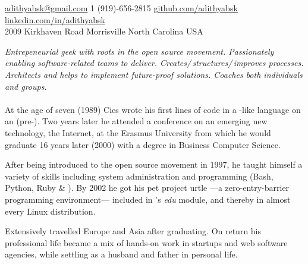 \documentclass[10pt,letterpaper]{article}
\begin{document}
\sloppy  %


\nobreakvspace{0.3em}  %

\noindent\href{mailto:adithyabsk@gmail.com}{adithyabsk\mbox{}@\mbox{}gmail.com}\sbull
\textsmaller{+}1 (919)-656-2815\sbull
\href{https://github.com/adithyabsk}{github.com/adithyabsk}\sbull
\href{http://linkedin.com/in/adithyabsk}{linkedin.com/in/adithyabsk}
\\
2009 Kirkhaven Road\sbull
Morrisville\sbull
North Carolina\sbull
USA

\spacedhrule{0.9em}{-0.4em}  %


\vspace{-1.3em}  %
\begin{multicols}{2}  %
\noindent \emph{Entrepeneurial geek with roots in the open source movement. Passionately enabling software-related teams to deliver. Creates/\,structures/\,improves processes. Architects and helps to implement future-proof solutions. Coaches both individuals and groups.}
\\
\\
At the age of seven (1989) Cies wrote his first lines of code in a -like language on an  (pre-).  Two years later he attended a conference on an emerging new technology, the Internet, at the Erasmus University from which he would graduate 16 years later (2000) with a degree in Business Computer Science.

After being introduced to the open source movement in 1997, he taught himself a variety of skills including system administration and programming (Bash, Python, Ruby \& \CPP).  By 2002 he got his pet project urtle ---a zero-entry-barrier programming environment--- included in 's \emph{edu} module, and thereby in almost every Linux distribution.

Extensively travelled Europe and Asia after graduating. On return his professional life became a mix of hands-on work in startups and web software agencies, while settling as a husband and father in personal life.
\end{multicols}
\end{document}

